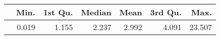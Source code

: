 \begin{table}[ht]
\centering
\begin{tabular}{rrrrrrr}
  \hline
 & Min. & 1st Qu. & Median & Mean & 3rd Qu. & Max. \\ 
  \hline
 & 0.019 & 1.155 & 2.237 & 2.992 & 4.091 & 23.507 \\ 
   \hline
\end{tabular}
\end{table}
